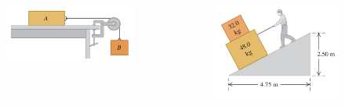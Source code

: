 \begin{frame}
\begin{columns}
    \begin{figure}
        \centering
        \includegraphics[width=1\linewidth]{figures/poleas1.jpg}
    \end{figure}

    \begin{figure}
        \centering
        \includegraphics[width=1\linewidth]{figures/cajas1.jpg}
    \end{figure}
\end{columns}
    
\end{frame}

